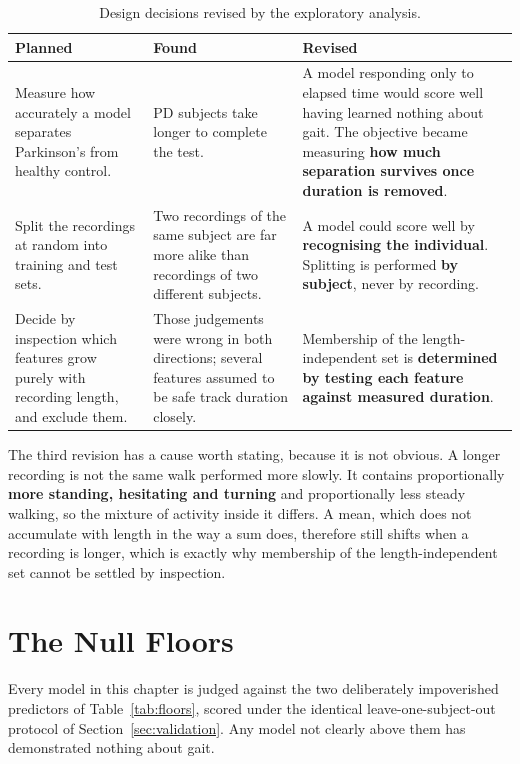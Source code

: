 \begin{table}[!htbp]
  \centering
  \caption[Design decisions revised by the exploratory analysis]{Design decisions revised by the exploratory analysis.}
  \label{tab:eda_impact}
  \begin{tabular}{@{}L{4.2cm}L{4.2cm}L{6.2cm}@{}}
    \toprule
    \textbf{Planned} & \textbf{Found} & \textbf{Revised} \\
    \midrule
    Measure how accurately a model separates Parkinson's from healthy control. &
    PD subjects take longer to complete the test. &
    A model responding only to elapsed time would score well having learned
    nothing about gait. The objective became measuring \textbf{how much
    separation survives once duration is removed}. \\
    Split the recordings at random into training and test sets. &
    Two recordings of the same subject are far more alike than recordings of two
    different subjects. &
    A model could score well by \textbf{recognising the individual}. Splitting is
    performed \textbf{by subject}, never by recording. \\
    Decide by inspection which features grow purely with recording length, and
    exclude them. &
    Those judgements were wrong in both directions; several features assumed to
    be safe track duration closely. &
    Membership of the length-independent set is \textbf{determined by testing
    each feature against measured duration}. \\
    \bottomrule
  \end{tabular}
\end{table}

The third revision has a cause worth stating, because it is not obvious. A
longer recording is not the same walk performed more slowly. It contains
proportionally \textbf{more standing, hesitating and turning} and proportionally
less steady walking, so the mixture of activity inside it differs. A mean, which
does not accumulate with length in the way a sum does, therefore still shifts
when a recording is longer, which is exactly why membership of the
length-independent set cannot be settled by inspection.

\section{The Null Floors}
\label{sec:res-floors}

Every model in this chapter is judged against the two deliberately
impoverished predictors of Table~\ref{tab:floors}, scored under the identical
leave-one-subject-out protocol of Section~\ref{sec:validation}. Any model not
clearly above them has demonstrated nothing about gait.

